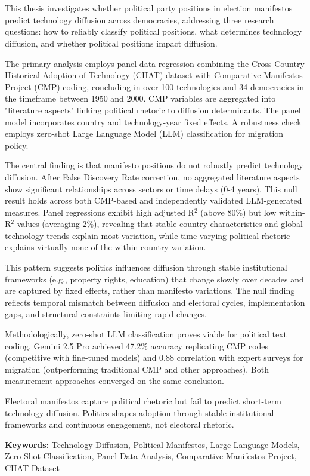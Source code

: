 \documentclass[../main.tex]{subfiles}
\begin{document}
\chapter*{\myAbstractTitle}

This thesis investigates whether political party positions in election manifestos predict technology diffusion across democracies, addressing three research questions: how to reliably classify political positions, what determines technology diffusion, and whether political positions impact diffusion. \par

The primary analysis employs panel data regression combining the Cross-Country Historical Adoption of Technology (CHAT) dataset with Comparative Manifestos Project (CMP) coding, concluding in over 100 technologies and 34 democracies in the timeframe between 1950 and 2000. 
CMP variables are aggregated into "literature aspects" linking political rhetoric to diffusion determinants. 
The panel model incorporates country and technology-year fixed effects. 
A robustness check employs zero-shot Large Language Model (LLM) classification for migration policy. \par

The central finding is that manifesto positions do not robustly predict technology diffusion. 
After False Discovery Rate correction, no aggregated literature aspects show significant relationships across sectors or time delays (0-4 years). 
This null result holds across both CMP-based and independently validated LLM-generated measures. 
Panel regressions exhibit high adjusted R$^2$ (above 80\%) but low within-R$^2$ values (averaging 2\%), revealing that stable country characteristics and global technology trends explain most variation, while time-varying political rhetoric explains virtually none of the within-country variation. \par

This pattern suggests politics influences diffusion through stable institutional frameworks (e.g., property rights, education) that change slowly over decades and are captured by fixed effects, rather than manifesto variations. 
The null finding reflects temporal mismatch between diffusion and electoral cycles, implementation gaps, and structural constraints limiting rapid changes. \par

Methodologically, zero-shot LLM classification proves viable for political text coding. 
Gemini 2.5 Pro achieved 47.2\% accuracy replicating CMP codes (competitive with fine-tuned models) and 0.88 correlation with expert surveys for migration (outperforming traditional CMP and other approaches). 
Both measurement approaches converged on the same conclusion. \par

Electoral manifestos capture political rhetoric but fail to predict short-term technology diffusion. 
Politics shapes adoption through stable institutional frameworks and continuous engagement, not electoral rhetoric.

\vspace{1cm}
\textbf{Keywords:} Technology Diffusion, Political Manifestos, Large Language Models, Zero-Shot Classification, Panel Data Analysis, Comparative Manifestos Project, CHAT Dataset
\end{document}
